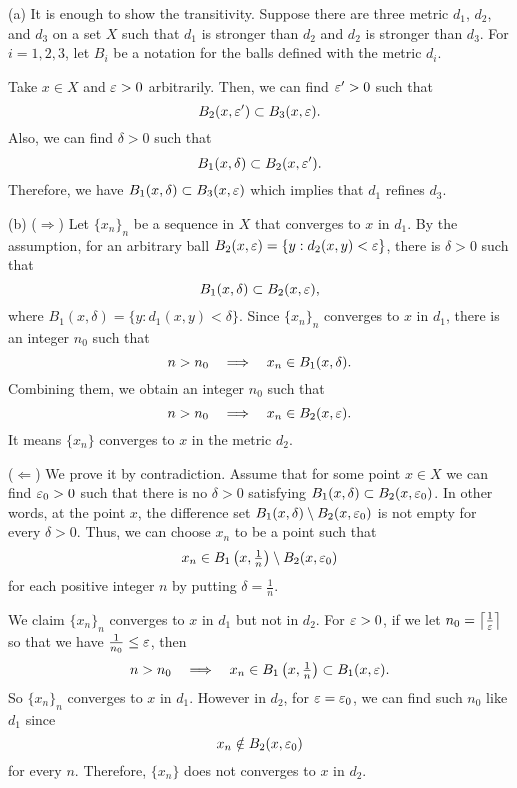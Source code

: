 \documentclass{../note}
\begin{document}
\begin{pf}
(a)
It is enough to show the transitivity.
Suppose there are three metric $d_1$, $d_2$, and $d_3$ on a set $X$ such that $d_1$ is stronger than $d_2$ and $d_2$ is stronger than $d_3$.
For $i=1,2,3$, let $B_i$ be a notation for the balls defined with the metric $d_i$.

Take $x\in X$ and $\varepsilon>0$ arbitrarily.
Then, we can find $\varepsilon'>0$ such that
\[B_2(x,\varepsilon')\subset B_3(x,\varepsilon).\]
Also, we can find $\delta>0$ such that
\[B_1(x,\delta)\subset B_2(x,\varepsilon').\]
Therefore, we have $B_1(x,\delta)\subset B_3(x,\varepsilon)$ which implies that $d_1$ refines $d_3$.

(b)
($\Rightarrow$)
Let $\{x_n\}_n$ be a sequence in $X$ that converges to $x$ in $d_1$.
By the assumption, for an arbitrary ball $B_2(x,\varepsilon)=\{y:d_2(x,y)<\varepsilon\}$, there is $\delta>0$ such that
\[B_1(x,\delta)\subset B_2(x,\varepsilon),\]
where $B_1(x,\delta)=\{y:d_1(x,y)<\delta\}$.
Since $\{x_n\}_n$ converges to $x$ in $d_1$, there is an integer $n_0$ such that
\[n>n_0\impl x_n\in B_1(x,\delta).\]
Combining them, we obtain an integer $n_0$ such that
\[n>n_0\impl x_n\in B_2(x,\e).\]
It means $\{x_n\}$ converges to $x$ in the metric $d_2$.

($\Leftarrow$)
We prove it by contradiction.
Assume that for some point $x\in X$ we can find $\varepsilon_0>0$ such that there is no $\delta>0$ satisfying $B_1(x,\delta)\subset B_2(x,\varepsilon_0)$.
In other words, at the point $x$, the difference set $B_1(x,\delta)\setminus B_2(x,\varepsilon_0)$ is not empty for every $\delta>0$.
Thus, we can choose $x_n$ to be a point such that
\[x_n\in B_1\left(x,\tfrac1n\right)\setminus B_2(x,\varepsilon_0)\]
for each positive integer $n$ by putting $\delta=\frac1n$.

We claim $\{x_n\}_n$ converges to $x$ in $d_1$ but not in $d_2$.
For $\varepsilon>0$, if we let $n_0=\left\lceil\frac1{\varepsilon}\right\rceil$ so that we have $\frac1{n_0}\le\varepsilon$, then
\[n>n_0\impl x_n\in B_1\left(x,\tfrac1n\right)\subset B_1(x,\e).\]
So $\{x_n\}_n$ converges to $x$ in $d_1$.
However in $d_2$, for $\varepsilon=\varepsilon_0$, we can find such $n_0$ like $d_1$ since
\[x_n\notin B_2(x,\varepsilon_0)\]
for every $n$.
Therefore, $\{x_n\}$ does not converges to $x$ in $d_2$.
\end{pf}
\end{document}
